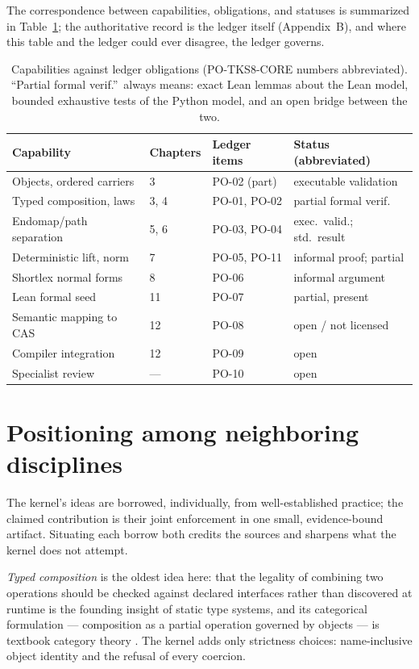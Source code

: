 The correspondence between capabilities, obligations, and statuses is
summarized in Table~\ref{ch01:tab:status}; the authoritative record is
the ledger itself (Appendix~B), and where this table and the ledger could
ever disagree, the ledger governs.

\begin{table}[htbp]
\centering
\begin{tabular}{@{}llll@{}}
\toprule
Capability & Chapters & Ledger items & Status (abbreviated) \\
\midrule
Objects, ordered carriers & 3 & PO-02 (part) & executable validation \\
Typed composition, laws & 3, 4 & PO-01, PO-02 & partial formal verif. \\
Endomap/path separation & 5, 6 & PO-03, PO-04 & exec.\ valid.; std.\ result \\
Deterministic lift, norm & 7 & PO-05, PO-11 & informal proof; partial \\
Shortlex normal forms & 8 & PO-06 & informal argument \\
Lean formal seed & 11 & PO-07 & partial, present \\
Semantic mapping to CAS & 12 & PO-08 & open / not licensed \\
Compiler integration & 12 & PO-09 & open \\
Specialist review & --- & PO-10 & open \\
\bottomrule
\end{tabular}
\caption{Capabilities against ledger obligations (PO-TKS8-CORE numbers
abbreviated). ``Partial formal verif.''\ always means: exact Lean lemmas
about the Lean model, bounded exhaustive tests of the Python model, and
an open bridge between the two.}
\label{ch01:tab:status}
\end{table}

\section{Positioning among neighboring disciplines}\label{ch01:sec:positioning}

The kernel's ideas are borrowed, individually, from well-established
practice; the claimed contribution is their joint enforcement in one
small, evidence-bound artifact. Situating each borrow both credits the
sources and sharpens what the kernel does not attempt.

\emph{Typed composition} is the oldest idea here: that the legality of
combining two operations should be checked against declared interfaces
rather than discovered at runtime is the founding insight of static type
systems, and its categorical formulation --- composition as a partial
operation governed by objects --- is textbook category theory
\cite{maclanecwm}. The kernel adds only strictness choices: name-inclusive
object identity and the refusal of every coercion.

